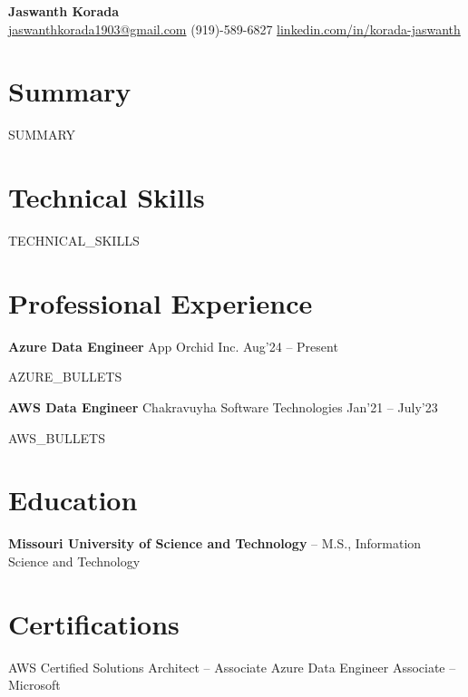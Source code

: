 \documentclass[10pt,letterpaper]{article}
\begin{document}
{\Huge \textbf{Jaswanth Korada}}\\
\href{mailto:jaswanthkorada1903@gmail.com}{jaswanthkorada1903@gmail.com} \textbar{} (919)-589-6827 \textbar{} \href{https://linkedin.com/in/korada-jaswanth}{linkedin.com/in/korada-jaswanth}

\section*{Summary}
{{SUMMARY}}

\section*{Technical Skills}
{{TECHNICAL_SKILLS}}

\section*{Professional Experience}
\textbf{Azure Data Engineer} \hfill App Orchid Inc. \hfill Aug'24 -- Present
\begin{itemize}
{{AZURE_BULLETS}}
\end{itemize}

\textbf{AWS Data Engineer} \hfill Chakravuyha Software Technologies \hfill Jan'21 -- July'23
\begin{itemize}
{{AWS_BULLETS}}
\end{itemize}

\section*{Education}
\textbf{Missouri University of Science and Technology} -- M.S., Information Science and Technology

\section*{Certifications}
AWS Certified Solutions Architect -- Associate \textbar{} Azure Data Engineer Associate -- Microsoft
\end{document}
